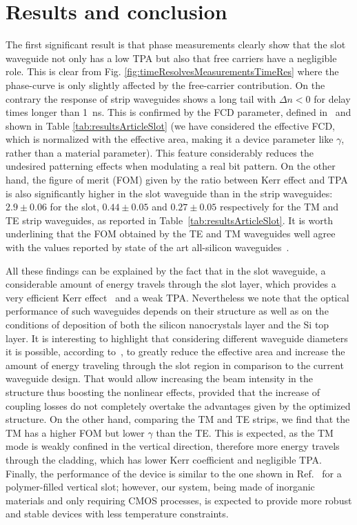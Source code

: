 \section{Results and conclusion}
The first significant result is that phase measurements clearly show that the slot waveguide not only has a low TPA but also that free carriers have a negligible role.
This is clear from Fig. \ref{fig:timeResolvesMeasurementsTimeRes} where the phase-curve is only slightly affected by the free-carrier contribution. On the contrary the response of strip waveguides shows a long tail with $\Delta n <0$ for delay times longer than 1~ns.
This is confirmed by the FCD parameter, defined in~\cite{Lin2007} and shown in Table \ref{tab:resultsArticleSlot} (we have considered the effective FCD, which is normalized with the effective area, making it a device parameter like $\gamma$, rather than a material parameter).
This feature considerably reduces the undesired patterning effects when modulating a real bit pattern. On the other hand, the figure of merit (FOM) given by the ratio between Kerr effect and TPA is also significantly higher in the slot waveguide than in the strip waveguides: $2.9\pm 0.06$ for the slot, $0.44 \pm 0.05$ and $0.27 \pm 0.05$ respectively for the TM and TE strip waveguides, as reported in Table~\ref{tab:resultsArticleSlot}.
It is worth underlining that the FOM obtained by the TE and TM waveguides well agree with the values reported by state of the art all-silicon waveguides~\cite{Koos2007a}.


All these findings can be explained by the fact that in the slot waveguide, a considerable amount of energy travels through the slot layer, which provides a very efficient Kerr effect~\cite{Trita2011} and a weak TPA.
Nevertheless we note that the optical performance of such waveguides depends on their structure as well as on the conditions of deposition of both the silicon nanocrystals layer and the Si top layer. It is interesting to highlight that considering different waveguide diameters it is possible, according to~\cite{Rukhlenko2012}, to greatly reduce the effective area and increase the amount of energy traveling through the slot region in comparison to the current waveguide design.
That would allow increasing the beam intensity in the structure thus boosting the nonlinear effects, provided that the increase of coupling losses do not completely overtake the advantages given by the optimized structure.
On the other hand, comparing the TM and TE strips, we find that the TM has a higher FOM but lower $\gamma$ than the TE.
This is expected, as the TM mode is weakly confined in the vertical direction, therefore more energy travels through the cladding, which has lower Kerr coefficient and negligible TPA.
Finally, the performance of the device is similar to the one shown in Ref.~\cite{Vallaitis2008} for a polymer-filled vertical slot; however, our system, being made of inorganic materials and only requiring CMOS processes, is expected to provide more robust and stable devices with less temperature constraints. 


